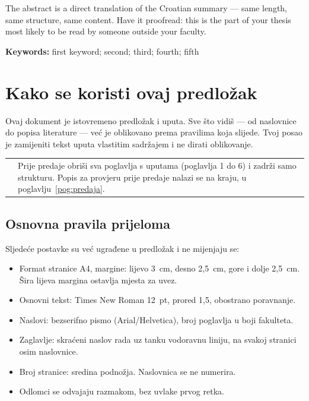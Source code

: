 \documentclass[12pt,a4paper,oneside]{report}
\makeatletter
\newcommand{\napomena}[1]{%
  \par\vspace{6pt}
  \noindent\begin{tabular}{@{}p{3pt}@{\hspace{10pt}}p{\dimexpr\textwidth-13pt\relax}@{}}
  \cellcolor{fakplava} & \small #1
  \end{tabular}\par\vspace{6pt}}
\makeatother
\begin{document}
The abstract is a direct translation of the Croatian summary — same length, same structure, same content. Have it proofread: this is the part of your thesis most likely to be read by someone outside your faculty.

\vspace{6pt}
\noindent\textbf{Keywords:} first keyword; second; third; fourth; fifth

\tableofcontents
\listoffigures
\listoftables

\chapter{Kako se koristi ovaj predložak}

Ovaj dokument je istovremeno predložak i uputa. Sve što vidiš — od naslovnice do popisa literature — već je oblikovano prema pravilima koja slijede. Tvoj posao je zamijeniti tekst uputa vlastitim sadržajem i ne dirati oblikovanje.

\napomena{Prije predaje obriši sva poglavlja s uputama (poglavlja 1 do 6) i zadrži samo strukturu. Popis za provjeru prije predaje nalazi se na kraju, u poglavlju~\ref{pog:predaja}.}

\section{Osnovna pravila prijeloma}

Sljedeće postavke su već ugrađene u predložak i ne mijenjaju se:

\begin{itemize}[leftmargin=*,itemsep=2pt,topsep=4pt]
  \item Format stranice A4, margine: lijevo 3~cm, desno 2{,}5~cm, gore i dolje 2{,}5~cm. Šira lijeva margina ostavlja mjesta za uvez.
  \item Osnovni tekst: Times New Roman 12~pt, prored 1{,}5, obostrano poravnanje.
  \item Naslovi: bezserifno pismo (Arial/Helvetica), broj poglavlja u boji fakulteta.
  \item Zaglavlje: skraćeni naslov rada uz tanku vodoravnu liniju, na svakoj stranici osim naslovnice.
  \item Broj stranice: sredina podnožja. Naslovnica se ne numerira.
  \item Odlomci se odvajaju razmakom, bez uvlake prvog retka.
\end{itemize}
\end{document}
